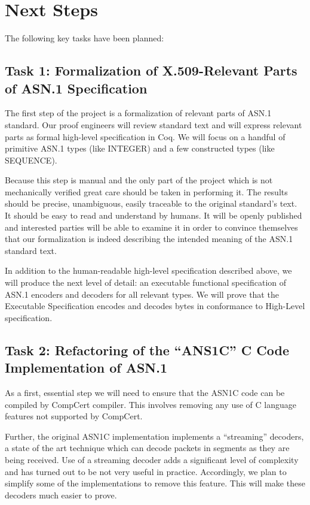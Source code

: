 \documentclass[acmsmall,nonacm]{acmart}
\begin{document}
 \section{Next Steps}
The following key tasks have been planned:
 
\subsection{Task 1: Formalization of X.509-Relevant Parts of ASN.1 Specification}
The first step of the project is a formalization of relevant parts of ASN.1 standard. Our proof engineers will review standard text and will express relevant parts as formal high-level specification in Coq. We will focus on a handful of primitive ASN.1 types (like INTEGER) and a few constructed types (like SEQUENCE).

Because this step is manual and the only part of the project which is not mechanically verified great care should be taken in performing it. The results should be precise, unambiguous, easily traceable to the original standard's text. It should be easy to read and understand by humans. It will be openly published and interested parties will be able to examine it in order to convince themselves that our formalization is indeed describing the intended meaning of the ASN.1 standard text.

In addition to the human-readable high-level specification described above, we will produce the next level of detail: an executable functional specification of ASN.1 encoders and decoders for all relevant types. We will prove that the Executable Specification encodes and decodes bytes in conformance to High-Level specification.

\subsection{Task 2: Refactoring of the ``ANS1C'' C Code Implementation of ASN.1}

As a first, essential step we will need to ensure that the ASN1C code can be compiled by CompCert compiler. This involves removing any use of C language features not supported by CompCert.

Further, the original ASN1C implementation implements a ``streaming'' decoders, a state of the art technique which can decode packets in segments as they are being received. Use of a streaming decoder adds a significant level of complexity and has turned out to be not very useful in practice. Accordingly, we plan to simplify some of the implementations to remove this feature. This will make these decoders much easier to prove.
\end{document}
